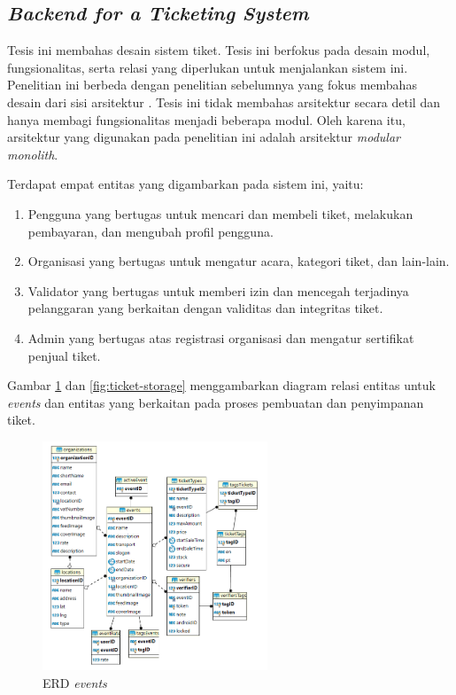 \subsection{\textit{Backend for a Ticketing System}}

Tesis ini membahas desain sistem tiket. Tesis ini berfokus pada desain modul, fungsionalitas, serta relasi yang diperlukan untuk menjalankan sistem ini. Penelitian ini berbeda dengan penelitian sebelumnya yang fokus membahas desain dari sisi arsitektur \parencite{backendForTicketing}. Tesis ini tidak membahas arsitektur secara detil dan hanya membagi fungsionalitas menjadi beberapa modul. Oleh karena itu, arsitektur yang digunakan pada penelitian ini adalah arsitektur \textit{modular monolith}.

Terdapat empat entitas yang digambarkan pada sistem ini, yaitu:

\begin{enumerate}
    \item Pengguna yang bertugas untuk mencari dan membeli tiket, melakukan pembayaran, dan mengubah profil pengguna.
    \item Organisasi yang bertugas untuk mengatur acara, kategori tiket, dan lain-lain.
    \item Validator yang bertugas untuk memberi izin dan mencegah terjadinya pelanggaran yang berkaitan dengan validitas dan integritas tiket.
    \item Admin yang bertugas atas registrasi organisasi dan mengatur sertifikat penjual tiket.
\end{enumerate}

\pagebreak

Gambar \ref{fig:event-rm} dan \ref{fig:ticket-storage} menggambarkan diagram relasi entitas untuk \textit{events} dan entitas yang berkaitan pada proses pembuatan dan penyimpanan tiket.

\begin{figure}[htbp]
    \centering
    \includegraphics[width=0.6\textwidth]{resources/chapter-2/event-rm.png}
    \caption{ERD \textit{events} \parencite{backendForTicketing}}
    \label{fig:event-rm}
\end{figure}

